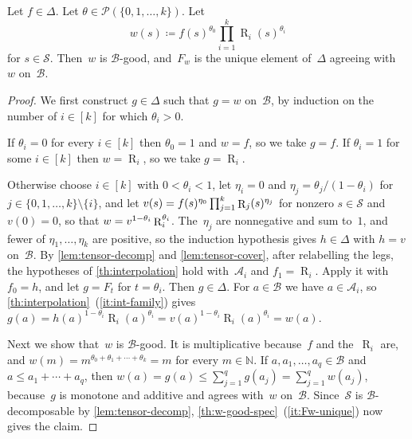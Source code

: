 \documentclass[11pt,letterpaper]{article}
\DeclareMathOperator{\tensorrank}{R}
\newcommand{\NN}{\mathbb{N}}
\begin{document}
\begin{proposition}\label{prop:qf}
Let $f \in \Delta$. Let $\theta \in \mathcal{P}(\{0, 1, \ldots, k\})$. Let 
\[
w(s) \coloneqq f(s)^{\theta_0} \prod_{i=1}^k \tensorrank_i(s)^{\theta_i}
\]
for $s \in \mathcal{S}$. Then~$w$ is $\mathcal{B}$-good, and~$F_w$ is the unique element of~$\Delta$ agreeing with~$w$ on~$\mathcal{B}$.
\end{proposition}
\begin{proof}
We first construct $g \in \Delta$ such that $g = w$ on~$\mathcal{B}$, by induction on the number of $i \in [k]$ for which $\theta_i > 0$.

If $\theta_i = 0$ for every $i \in [k]$ then $\theta_0 = 1$ and $w = f$, so we take $g = f$. If $\theta_i = 1$ for some $i \in [k]$ then $w = \tensorrank_i$, so we take $g = \tensorrank_i$.

Otherwise choose $i \in [k]$ with $0 < \theta_i < 1$, let $\eta_i = 0$ and $\eta_j = \theta_j/(1 - \theta_i)$ for $j \in \{0, 1, \ldots, k\} \setminus \{i\}$, and let $v(s) = f(s)^{\eta_0} \prod_{j=1}^{\smash[t]{k}} \tensorrank_j(s)^{\eta_j}$ for nonzero $s \in \mathcal{S}$ and $v(0) = 0$, so that $w = v^{\smash{1-\theta_i}} \tensorrank_i^{\smash[t]{\theta_i}}$. The~$\eta_j$ are nonnegative and sum to~$1$, and fewer of $\eta_1, \ldots, \eta_k$ are positive, so the induction hypothesis gives $h \in \Delta$ with $h = v$ on~$\mathcal{B}$. By \cref{lem:tensor-decomp} and \cref{lem:tensor-cover}, after relabelling the legs, the hypotheses of \cref{th:interpolation} hold with~$\mathcal{A}_i$ and $f_1 = \tensorrank_i$. Apply it with $f_0 = h$, and let $g = F_t$ for $t = \theta_i$. Then $g \in \Delta$. For $a \in \mathcal{B}$ we have $a \in \mathcal{A}_i$, so \cref{th:interpolation}~(\ref{it:int-family}) gives $g(a) = h(a)^{1-\theta_i} \tensorrank_i(a)^{\theta_i} = v(a)^{1-\theta_i} \tensorrank_i(a)^{\theta_i} = w(a)$.

Next we show that~$w$ is $\mathcal{B}$-good. It is multiplicative because~$f$ and the~$\tensorrank_i$ are, and $w(m) = m^{\theta_0 + \theta_1 + \cdots + \theta_k} = m$ for every $m \in \NN$. If $a, a_1, \ldots, a_q \in \mathcal{B}$ and $a \leq a_1 + \cdots + a_q$, then $w(a) = g(a) \leq \sum_{j=1}^q g(a_j) = \sum_{j=1}^q w(a_j)$, because~$g$ is monotone and additive and agrees with~$w$ on~$\mathcal{B}$. Since~$\mathcal{S}$ is $\mathcal{B}$-decomposable by \cref{lem:tensor-decomp}, \cref{th:w-good-spec}~(\ref{it:Fw-unique}) now gives the claim.
\end{proof}
\end{document}
